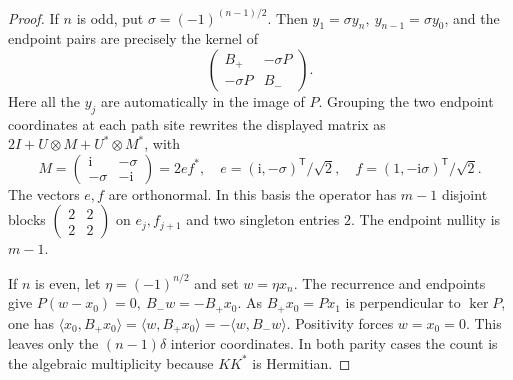 \documentclass[11pt,letterpaper]{article}
\newcommand{\ii}{\mathrm i}
\begin{document}
\begin{proof}
If \(n\) is odd, put \(\sigma=(-1)^{(n-1)/2}\). Then \(y_1=\sigma y_n,\ y_{n-1}=\sigma y_0\), and the endpoint pairs are precisely the kernel of
\[
 \begin{pmatrix}B_+&-\sigma P\\-\sigma P&B_-\end{pmatrix}.
\]
Here all the \(y_j\) are automatically in the image of \(P\). Grouping the two endpoint coordinates at each path site rewrites the displayed matrix as \(2I+U\otimes M+U^*\otimes M^*\), with
\[
 M=\begin{pmatrix}\ii&-\sigma\\-\sigma&-\ii\end{pmatrix}
   =2ef^*,\quad e=(\ii,-\sigma)^{\mathsf T}/\sqrt2,\quad
 f=(1,-\ii\sigma)^{\mathsf T}/\sqrt2.
\]
The vectors \(e,f\) are orthonormal. In this basis the operator has \(m-1\) disjoint blocks
\(\left(\begin{smallmatrix}2&2\\2&2\end{smallmatrix}\right)\) on \(e_j,f_{j+1}\) and two singleton entries \(2\). The endpoint nullity is \(m-1\).

If \(n\) is even, let \(\eta=(-1)^{n/2}\) and set \(w=\eta x_n\). The recurrence and endpoints give \(P(w-x_0)=0,\ B_-w=-B_+x_0\). As \(B_+x_0=Px_1\) is perpendicular to \(\ker P\), one has
\(\langle x_0,B_+x_0\rangle=\langle w,B_+x_0\rangle=-\langle w,B_-w\rangle\).
Positivity forces \(w=x_0=0\). This leaves only the \((n-1)\delta\) interior coordinates. In both parity cases the count is the algebraic multiplicity because \(KK^*\) is Hermitian.
\end{proof}

\clearpage
\end{document}
